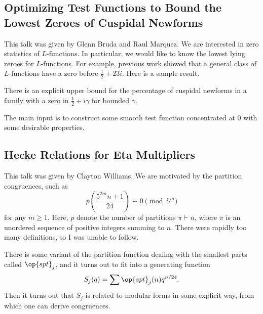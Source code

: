 \documentclass{article}
\begin{document}
\subsection{Optimizing Test Functions to Bound the Lowest Zeroes of Cuspidal Newforms}
This talk was given by Glenn Bruda and Raul Marquez. We are interested in zero statistics of $L$-functions. In particular, we would like to know the lowest lying zeroes for $L$-functions. For example, previous work showed that a general class of $L$-functions have a zero before $\frac12+23i$. Here is a sample result.
\begin{theorem}
	There is an explicit upper bound for the percentage of cuspidal newforms in a family with a zero in $\frac12+i\gamma$ for bounded $\gamma$.
\end{theorem}
The main input is to construct some smooth test function concentrated at $0$ with some desirable properties.

\subsection{Hecke Relations for Eta Multipliers}
This talk was given by Clayton Williams. We are motivated by the partition congruences, such as
\[p\left(\frac{5^{2m}n+1}{24}\right)\equiv0\pmod{5^m}\]
for any $m\ge1$. Here, $p$ denote the number of partitions $\pi\vdash n$, where $\pi$ is an unordered sequence of positive integers summing to $n$. There were rapidly too many definitions, so I was unable to follow.

There is some variant of the partition function dealing with the smallest parts called $\op{spt}_j$, and it turns out to fit into a generating function
\[S_j(q)=\sum\op{spt}_j(n)q^{n/24}.\]
Then it turns out that $S_j$ is related to modular forms in some explicit way, from which one can derive congruences.
\end{document}
